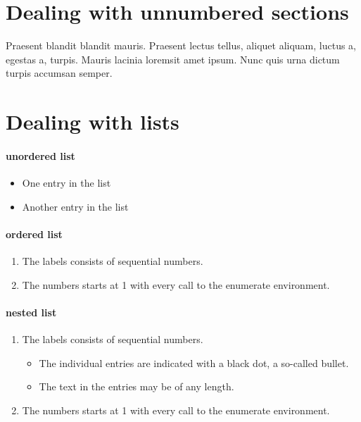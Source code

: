 \documentclass{article}
\begin{document}
\section*{Dealing with unnumbered sections}
Praesent blandit blandit mauris. Praesent
lectus tellus, aliquet aliquam, luctus a, egestas a, turpis. Mauris 
lacinia loremsit amet ipsum. Nunc quis urna dictum turpis accumsan 
semper.





\section{Dealing with lists}

\paragraph{unordered list}
\renewcommand{\labelitemi}{$\blacksquare$}
\begin{itemize}
  \item One entry in the list
  \item Another entry in the list
\end{itemize}

\paragraph{ordered list}
\begin{enumerate}
  \item The labels consists of sequential numbers.
  \item The numbers starts at 1 with every call to the enumerate environment.
\end{enumerate}


\paragraph{nested list}
\renewcommand{\labelitemi}{\textbullet}
\begin{enumerate}
   \item The labels consists of sequential numbers.
   \begin{itemize}
     \item The individual entries are indicated with a black dot, a so-called bullet.
     \item The text in the entries may be of any length.
   \end{itemize}
   \item The numbers starts at 1 with every call to the enumerate environment.
\end{enumerate}
\end{document}
